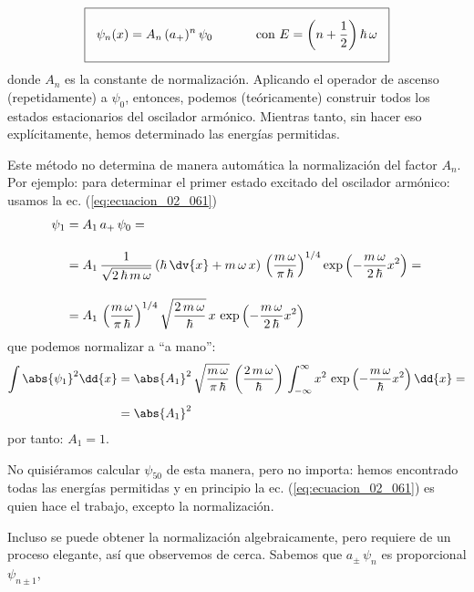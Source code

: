 \begin{align}
\setlength{\fboxsep}{3\fboxsep}\boxed{ \psi_{n} (x) = A_{n} \, (a_{+})^{n} \, \psi_{0} \hspace{1.2cm} \mbox{con } E = \left( n + \dfrac{1}{2} \right) \hbar \, \omega}
\label{eq:ecuacion_02_061}
 \end{align}
donde $A_{n}$ es la constante de normalización. Aplicando el operador de ascenso (repetidamente) a $\psi_{0}$, entonces, podemos (teóricamente) construir todos los estados estacionarios del oscilador armónico. Mientras tanto, sin hacer eso explícitamente, hemos determinado las energías permitidas.
\par
Este método no determina de manera automática la normalización del factor $A_{n}$. Por ejemplo: para determinar el primer estado excitado del oscilador armónico: usamos la ec. (\ref{eq:ecuacion_02_061})
\begin{align}
\begin{aligned}[b]
\psi_{1} &= A_{1} \, a_{+} \, \psi_{0} = \\[1em]
&= A_{1} \, \dfrac{1}{\sqrt{2 \, \hbar \, m \, \omega}} \left( \hbar \, \dv{x} + m \, \omega \, x \right) \, \left( \dfrac{m \, \omega}{\pi \, \hbar} \right)^{1/4} \exp \left( - \dfrac{m \, \omega}{2 \, \hbar} x^{2} \right) = \\[1em]
&= A_{1} \, \left( \dfrac{m \, \omega}{\pi \, \hbar} \right)^{1/4} \sqrt{\dfrac{2 \, m \, \omega}{\hbar}} \, x \, \exp \left( - \dfrac{m \, \omega}{2 \, \hbar} x^{2} \right)
\end{aligned}
\label{eq:ecuacion_02_062}
\end{align}
que podemos normalizar a \enquote{a mano}:
\begin{align*}
\int \abs{\psi_{1}}^{2} \dd{x} &= \abs{A_{1}}^{2} \, \sqrt{ \dfrac{m \, \omega}{\pi \, \hbar}} \, \left( \dfrac{2 \, m \, \omega}{\hbar} \right) \,\int_{-\infty}^{\infty} x^{2} \, \exp \left( - \dfrac{m \, \omega}{\hbar} x^{2} \right) \dd{x} = \\[0.5em]
&= \abs{A_{1}}^{2}
\end{align*}
por tanto: $A_{1} = 1$.
\par
No quisiéramos calcular $\psi_{50}$ de esta manera, pero no importa: hemos encontrado todas las energías permitidas y en principio la ec. (\ref{eq:ecuacion_02_061}) es quien hace el trabajo, excepto la normalización.
\par
Incluso se puede obtener la normalización algebraicamente, pero requiere de un proceso elegante, así que observemos de cerca. Sabemos que $a_{\pm} \, \psi_{n}$ es proporcional $\psi_{n \pm 1}$,
